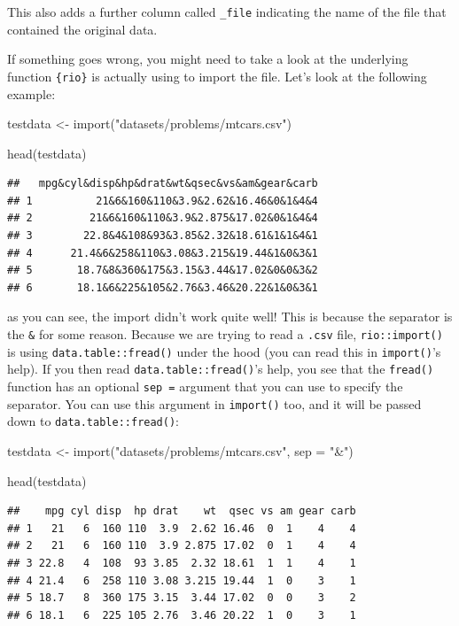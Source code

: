 \documentclass[
]{article}
\newenvironment{Shaded}{\begin{snugshade}}{\end{snugshade}}
\newcommand{\AttributeTok}[1]{\textcolor[rgb]{0.77,0.63,0.00}{#1}}
\newcommand{\FunctionTok}[1]{\textcolor[rgb]{0.00,0.00,0.00}{#1}}
\newcommand{\NormalTok}[1]{#1}
\newcommand{\OtherTok}[1]{\textcolor[rgb]{0.56,0.35,0.01}{#1}}
\newcommand{\StringTok}[1]{\textcolor[rgb]{0.31,0.60,0.02}{#1}}
\begin{document}
This also adds a further column called \texttt{\_file} indicating the name of the file that contained the
original data.

If something goes wrong, you might need to take a look at the underlying function \texttt{\{rio\}} is
actually using to import the file. Let's look at the following example:

\begin{Shaded}
\begin{Highlighting}[]
\NormalTok{testdata }\OtherTok{\textless{}{-}} \FunctionTok{import}\NormalTok{(}\StringTok{"datasets/problems/mtcars.csv"}\NormalTok{)}

\FunctionTok{head}\NormalTok{(testdata)}
\end{Highlighting}
\end{Shaded}

\begin{verbatim}
##   mpg&cyl&disp&hp&drat&wt&qsec&vs&am&gear&carb
## 1          21&6&160&110&3.9&2.62&16.46&0&1&4&4
## 2         21&6&160&110&3.9&2.875&17.02&0&1&4&4
## 3        22.8&4&108&93&3.85&2.32&18.61&1&1&4&1
## 4      21.4&6&258&110&3.08&3.215&19.44&1&0&3&1
## 5       18.7&8&360&175&3.15&3.44&17.02&0&0&3&2
## 6       18.1&6&225&105&2.76&3.46&20.22&1&0&3&1
\end{verbatim}

as you can see, the import didn't work quite well! This is because the separator is the \texttt{\&} for
some reason. Because we are trying to read a \texttt{.csv} file, \texttt{rio::import()} is using
\texttt{data.table::fread()} under the hood (you can read this in \texttt{import()}'s help). If you then read
\texttt{data.table::fread()}'s help, you see that the \texttt{fread()} function has an optional \texttt{sep\ =} argument
that you can use to specify the separator. You can use this argument in \texttt{import()} too, and it will
be passed down to \texttt{data.table::fread()}:

\begin{Shaded}
\begin{Highlighting}[]
\NormalTok{testdata }\OtherTok{\textless{}{-}} \FunctionTok{import}\NormalTok{(}\StringTok{"datasets/problems/mtcars.csv"}\NormalTok{, }\AttributeTok{sep =} \StringTok{"\&"}\NormalTok{)}

\FunctionTok{head}\NormalTok{(testdata)}
\end{Highlighting}
\end{Shaded}

\begin{verbatim}
##    mpg cyl disp  hp drat    wt  qsec vs am gear carb
## 1   21   6  160 110  3.9  2.62 16.46  0  1    4    4
## 2   21   6  160 110  3.9 2.875 17.02  0  1    4    4
## 3 22.8   4  108  93 3.85  2.32 18.61  1  1    4    1
## 4 21.4   6  258 110 3.08 3.215 19.44  1  0    3    1
## 5 18.7   8  360 175 3.15  3.44 17.02  0  0    3    2
## 6 18.1   6  225 105 2.76  3.46 20.22  1  0    3    1
\end{verbatim}
\end{document}
